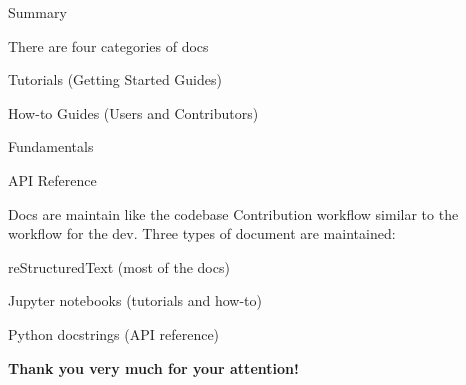 \documentclass[english,aspectratio=169]{beamer}
\let\tempone\itemize
\let\temptwo\enditemize
\renewenvironment{itemize}{\tempone\addtolength{\itemsep}{0.35\baselineskip}}{\temptwo}
\begin{document}
\begin{frame}{Summary}
\footnotesize

\begin{block}{There are four categories of docs}
\begin{itemize}
    \item Tutorials (Getting Started Guides)
    \item How-to Guides (Users and Contributors)
    \item Fundamentals
    \item API Reference
\end{itemize}
\end{block}

\begin{block}{Docs are maintain like the codebase}
Contribution workflow similar to the workflow for the dev. Three types of document are maintained:
\begin{itemize}
    \item reStructuredText (most of the docs)
    \item Jupyter notebooks (tutorials and how-to)
    \item Python docstrings (API reference)
\end{itemize}
\end{block}

\begin{exampleblock}{}
    \centering
    \textbf{Thank you very much for your attention!}
\end{exampleblock}

\end{frame}
\end{document}
